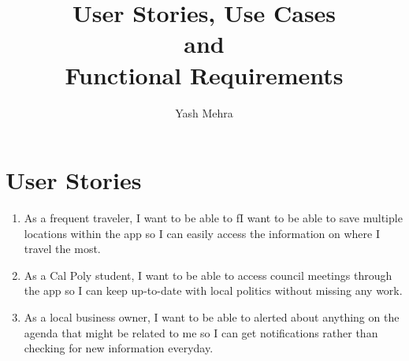 \documentclass{article}
\title{User Stories, Use Cases\\
  {\large and}\\
  Functional Requirements}
\author{Yash Mehra}
\newcommand{\story}[3]{\item As a #1, I want to be able to #2 so I can #3.}
\begin{document}
\maketitle
\tableofcontents
\section{User Stories}
\begin{enumerate}
\story{frequent traveler}{fI want to be able to save multiple locations within
the app}{easily access the information on where I travel the most}\label{agenda}
\story{Cal Poly student}{access council meetings through the app}{keep up-to-date with local politics without missing any work}
\story{local business owner}{alerted about anything on the agenda that might be related to me}{get notifications rather than checking for new information everyday}
\end{enumerate}
\end{document}
